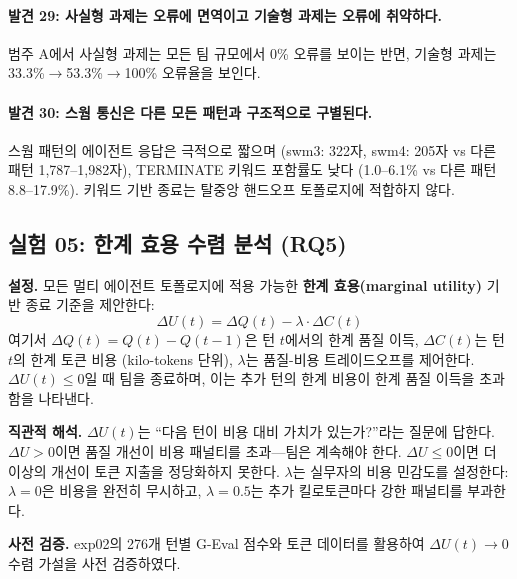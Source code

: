 \paragraph{발견 29: 사실형 과제는 오류에 면역이고 기술형 과제는 오류에 취약하다.}
범주 A에서 사실형 과제는 모든 팀 규모에서 0\% 오류를 보이는 반면, 기술형 과제는 33.3\%$\to$53.3\%$\to$100\% 오류율을 보인다.

\paragraph{발견 30: 스웜 통신은 다른 모든 패턴과 구조적으로 구별된다.}
스웜 패턴의 에이전트 응답은 극적으로 짧으며 (swm3: 322자, swm4: 205자 vs 다른 패턴 1,787--1,982자), TERMINATE 키워드 포함률도 낮다 (1.0--6.1\% vs 다른 패턴 8.8--17.9\%). 키워드 기반 종료는 탈중앙 핸드오프 토폴로지에 적합하지 않다.

\subsection{실험 05: 한계 효용 수렴 분석 (RQ5)}
\label{sec:exp05}

\textbf{설정.} 모든 멀티 에이전트 토폴로지에 적용 가능한 \textbf{한계 효용(marginal utility)} 기반 종료 기준을 제안한다:
\begin{equation}
\Delta U(t) = \Delta Q(t) - \lambda \cdot \Delta C(t)
\end{equation}
여기서 $\Delta Q(t) = Q(t) - Q(t-1)$은 턴 $t$에서의 한계 품질 이득, $\Delta C(t)$는 턴 $t$의 한계 토큰 비용 (kilo-tokens 단위), $\lambda$는 품질-비용 트레이드오프를 제어한다. $\Delta U(t) \leq 0$일 때 팀을 종료하며, 이는 추가 턴의 한계 비용이 한계 품질 이득을 초과함을 나타낸다.

\textbf{직관적 해석.} $\Delta U(t)$는 ``다음 턴이 비용 대비 가치가 있는가?''라는 질문에 답한다. $\Delta U > 0$이면 품질 개선이 비용 패널티를 초과---팀은 계속해야 한다. $\Delta U \leq 0$이면 더 이상의 개선이 토큰 지출을 정당화하지 못한다. $\lambda$는 실무자의 비용 민감도를 설정한다: $\lambda=0$은 비용을 완전히 무시하고, $\lambda=0.5$는 추가 킬로토큰마다 강한 패널티를 부과한다.

\textbf{사전 검증.} exp02의 276개 턴별 G-Eval 점수와 토큰 데이터를 활용하여 $\Delta U(t) \to 0$ 수렴 가설을 사전 검증하였다.

